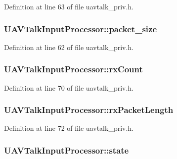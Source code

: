 Definition at line 63 of file uavtalk\-\_\-priv.\-h.

\hypertarget{struct_u_a_v_talk_input_processor_a21adf6a8fc9bfc307b883a7b8ff412d1}{
\subsubsection[{packet\-\_\-size}]{ U\-A\-V\-Talk\-Input\-Processor\-::packet\-\_\-size}}\label{struct_u_a_v_talk_input_processor_a21adf6a8fc9bfc307b883a7b8ff412d1}


Definition at line 62 of file uavtalk\-\_\-priv.\-h.

\hypertarget{struct_u_a_v_talk_input_processor_a478ba62595ad5977cbc9c0897e11ee10}{
\subsubsection[{rx\-Count}]{ U\-A\-V\-Talk\-Input\-Processor\-::rx\-Count}}\label{struct_u_a_v_talk_input_processor_a478ba62595ad5977cbc9c0897e11ee10}


Definition at line 70 of file uavtalk\-\_\-priv.\-h.

\hypertarget{struct_u_a_v_talk_input_processor_a39d9853a0ea6695927ffe0930225cfbe}{
\subsubsection[{rx\-Packet\-Length}]{ U\-A\-V\-Talk\-Input\-Processor\-::rx\-Packet\-Length}}\label{struct_u_a_v_talk_input_processor_a39d9853a0ea6695927ffe0930225cfbe}


Definition at line 72 of file uavtalk\-\_\-priv.\-h.

\hypertarget{struct_u_a_v_talk_input_processor_ae2d58b353cb569cf8fcb956f1b0b3413}{
\subsubsection[{state}]{ U\-A\-V\-Talk\-Input\-Processor\-::state}}\label{struct_u_a_v_talk_input_processor_ae2d58b353cb569cf8fcb956f1b0b3413}


